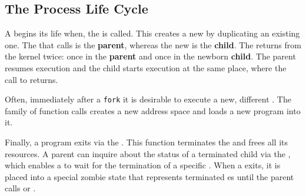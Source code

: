 \subsection{The Process Life Cycle}\label{subsec:Process_Life_Cycle}
A  begins its life when, the   is called.
This creates a new  by duplicating an existing one.
The  that calls  is the \textbf{parent}, whereas the new  is the \textbf{child}.
The   returns from the kernel twice: once in the \textbf{parent} and once in the newborn \textbf{child}.
The parent resumes execution and the child starts execution at the same place, where the call to  returns.

Often, immediately after a \texttt{fork} it is desirable to execute a new, different .
The  family of function calls creates a new address space and loads a new program into it.

Finally, a program exits via the  .
This function terminates the  and frees all its resources.
A parent  can inquire about the status of a terminated child via the  , which enables a  to wait for the termination of a specific .
When a  exits, it is placed into a special zombie state that represents terminated es until the parent calls  or .









